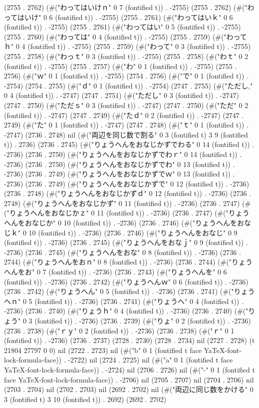 (2755 . 2762) (#("わってはいけｎ" 0 7 (fontified t)) . -2755) (2755 . 2762) (#("わってはいけ" 0 6 (fontified t)) . -2755) (2755 . 2761) (#("わってはいｋ" 0 6 (fontified t)) . -2755) (2755 . 2761) (#("わってはい" 0 5 (fontified t)) . -2755) (2755 . 2760) (#("わっては" 0 4 (fontified t)) . -2755) (2755 . 2759) (#("わってｈ" 0 4 (fontified t)) . -2755) (2755 . 2759) (#("わって" 0 3 (fontified t)) . -2755) (2755 . 2758) (#("わっｔ" 0 3 (fontified t)) . -2755) (2755 . 2758) (#("わｔ" 0 2 (fontified t)) . -2755) (2755 . 2757) (#("わ" 0 1 (fontified t)) . -2755) (2755 . 2756) (#("ｗ" 0 1 (fontified t)) . -2755) (2754 . 2756) (#("で" 0 1 (fontified t)) . -2754) (2754 . 2755) (#("ｄ" 0 1 (fontified t)) . -2754) (2747 . 2755) (#("ただし," 0 4 (fontified t)) . -2747) (2747 . 2751) (#("ただし" 0 3 (fontified t)) . -2747) (2747 . 2750) (#("ただｓ" 0 3 (fontified t)) . -2747) (2747 . 2750) (#("ただ" 0 2 (fontified t)) . -2747) (2747 . 2749) (#("たｄ" 0 2 (fontified t)) . -2747) (2747 . 2749) (#("た" 0 1 (fontified t)) . -2747) (2747 . 2748) (#("ｔ" 0 1 (fontified t)) . -2747) (2736 . 2748) nil (#("両辺を同じ数で割る" 0 3 (fontified t) 3 9 (fontified t)) . 2736) (2736 . 2745) (#("りょうへんをおなじかずでわる" 0 14 (fontified t)) . -2736) (2736 . 2750) (#("りょうへんをおなじかずでわｒ" 0 14 (fontified t)) . -2736) (2736 . 2750) (#("りょうへんをおなじかずでわ" 0 13 (fontified t)) . -2736) (2736 . 2749) (#("りょうへんをおなじかずでｗ" 0 13 (fontified t)) . -2736) (2736 . 2749) (#("りょうへんをおなじかずで" 0 12 (fontified t)) . -2736) (2736 . 2748) (#("りょうへんをおなじかずｄ" 0 12 (fontified t)) . -2736) (2736 . 2748) (#("りょうへんをおなじかず" 0 11 (fontified t)) . -2736) (2736 . 2747) (#("りょうへんをおなじかｚ" 0 11 (fontified t)) . -2736) (2736 . 2747) (#("りょうへんをおなじか" 0 10 (fontified t)) . -2736) (2736 . 2746) (#("りょうへんをおなじｋ" 0 10 (fontified t)) . -2736) (2736 . 2746) (#("りょうへんをおなじ" 0 9 (fontified t)) . -2736) (2736 . 2745) (#("りょうへんをおなｊ" 0 9 (fontified t)) . -2736) (2736 . 2745) (#("りょうへんをおな" 0 8 (fontified t)) . -2736) (2736 . 2744) (#("りょうへんをおｎ" 0 8 (fontified t)) . -2736) (2736 . 2744) (#("りょうへんをお" 0 7 (fontified t)) . -2736) (2736 . 2743) (#("りょうへんを" 0 6 (fontified t)) . -2736) (2736 . 2742) (#("りょうへんｗ" 0 6 (fontified t)) . -2736) (2736 . 2742) (#("りょうへん" 0 5 (fontified t)) . -2736) (2736 . 2741) (#("りょうへｎ" 0 5 (fontified t)) . -2736) (2736 . 2741) (#("りょうへ" 0 4 (fontified t)) . -2736) (2736 . 2740) (#("りょうｈ" 0 4 (fontified t)) . -2736) (2736 . 2740) (#("りょう" 0 3 (fontified t)) . -2736) (2736 . 2739) (#("りょ" 0 2 (fontified t)) . -2736) (2736 . 2738) (#("ｒｙ" 0 2 (fontified t)) . -2736) (2736 . 2738) (#("ｒ" 0 1 (fontified t)) . -2736) (2736 . 2737) (2728 . 2730) (2728 . 2734) nil (2727 . 2728) (t 21804 27797 0 0) nil (2722 . 2723) nil (#("b" 0 1 (fontified t face YaTeX-font-lock-formula-face)) . -2722) nil (2724 . 2725) nil (#("a" 0 1 (fontified t face YaTeX-font-lock-formula-face)) . -2724) nil (2706 . 2726) nil (#("-" 0 1 (fontified t face YaTeX-font-lock-formula-face)) . -2706) nil (2705 . 2707) nil (2704 . 2706) nil (2703 . 2704) nil (2702 . 2703) nil (2692 . 2702) nil (#("両辺に同じ数をかける" 0 3 (fontified t) 3 10 (fontified t)) . 2692) (2692 . 2702) 